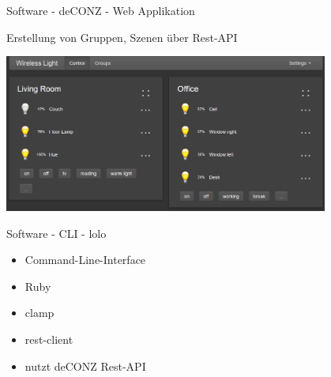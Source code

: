 \begin{frame}{Software - deCONZ - Web Applikation}

Erstellung von Gruppen, Szenen über Rest-API

  \begin{center}
    \includegraphics[width=0.8\textwidth]{images/deconz_web}
  \end{center}
\end{frame}

\begin{frame}{Software - CLI - lolo}

  \begin{itemize}
    \item Command-Line-Interface
    \item Ruby
    \item clamp
    \item rest-client
    \item nutzt deCONZ Rest-API
  \end{itemize}
\end{frame}